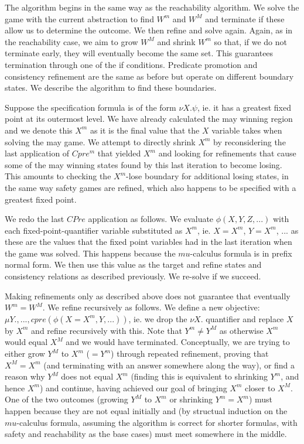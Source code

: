 The algorithm begins in the same way as the reachability algorithm. We solve the game with the current abstraction to find $W^m$ and $W^M$ and terminate if these allow us to determine the outcome. We then refine and solve again. Again, as in the reachability case, we aim to grow $W^M$ and shrink $W^m$ so that, if we do not terminate early, they will eventually become the same set. This guarantees termination through one of the if conditions. Predicate promotion and consistency refinement are the same as before but operate on different boundary states. We describe the algorithm to find these boundaries. 

Suppose the specification formula is of the form $\nu X. \psi$, ie. it has a greatest fixed point at its outermost level. We have already calculated the may winning region and we denote this $X^m$ as it is the final value that the $X$ variable takes when solving the may game. We attempt to directly shrink $X^m$ by reconsidering the last application of $Cpre^m$ that yielded $X^m$ and looking for refinements that cause some of the may winning states found by this last iteration to become losing. This amounts to checking the $X^m$-lose boundary for additional losing states, in the same way safety games are refined, which also happens to be specified with a greatest fixed point.

We redo the last $CPre$ application as follows. We evaluate $\phi(X, Y, Z, ...)$ with each fixed-point-quantifier variable substituted as $X^m$, ie. $X=X^m$, $Y=X^m$, ... as these are the values that the fixed point variables had in the last iteration when the game was solved. This happens because the $mu$-calculus formula is in prefix normal form. We then use this value as the target and refine states and consistency relations as described previously. We re-solve if we succeed.

Making refinements only as described above does not guarantee that eventually $W^m = W^M$. We refine recursively as follows. We define a new objective: $\mu Y., ..., cpre(\phi(X=X^m, Y, ...))$, ie. we drop the $\nu X.$ quantifier and replace $X$ by $X^m$ and refine recursively with this. Note that $Y^m \neq Y^M$ as otherwise $X^m$ would equal $X^M$ and we would have terminated. Conceptually, we are trying to either grow $Y^M$ to $X^m$ ($=Y^m$) through repeated refinement, proving that $X^M = X^m$ (and terminating with an answer somewhere along the way), or find a reason why $Y^M$ does not equal $X^m$ (finding this is equivalent to shrinking $Y^m$, and hence $X^m$) and continue, having achieved our goal of bringing $X^m$ closer to $X^M$. One of the two outcomes (growing $Y^M$ to $X^m$ or shrinking $Y^m = X^m$) must happen because they are not equal initially and (by structual induction on the $mu$-calculus formula, assuming the algorithm is correct for shorter formulas, with safety and reachability as the base cases) must meet somewhere in the middle.

